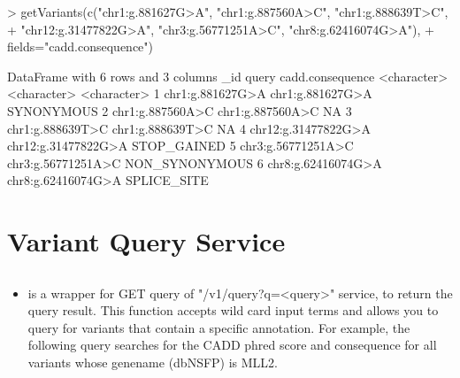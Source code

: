 \documentclass[12pt]{article}
\begin{document}
\begin{Schunk}
\begin{Sinput}
> getVariants(c("chr1:g.881627G>A", "chr1:g.887560A>C", "chr1:g.888639T>C",
+               "chr12:g.31477822G>A", "chr3:g.56771251A>C", "chr8:g.62416074G>A"),
+             fields="cadd.consequence")
\end{Sinput}
\begin{Soutput}
DataFrame with 6 rows and 3 columns
                  _id               query cadd.consequence
          <character>         <character>      <character>
1    chr1:g.881627G>A    chr1:g.881627G>A       SYNONYMOUS
2    chr1:g.887560A>C    chr1:g.887560A>C               NA
3    chr1:g.888639T>C    chr1:g.888639T>C               NA
4 chr12:g.31477822G>A chr12:g.31477822G>A      STOP_GAINED
5  chr3:g.56771251A>C  chr3:g.56771251A>C   NON_SYNONYMOUS
6  chr8:g.62416074G>A  chr8:g.62416074G>A      SPLICE_SITE
\end{Soutput}
\end{Schunk}


\section{Variant Query Service}

\subsection{}

\begin{itemize}
\item {} is a wrapper for GET query of "/v1/query?q=<query>" service, to return  the query result. This function accepts wild card input terms and allows you to query for variants that contain a specific annotation. For example, the following query searches for the CADD phred score and consequence for all variants whose genename (dbNSFP) is MLL2.
\end{itemize}
\end{document}
